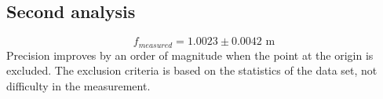 
\clearpage
\subsection{Second analysis}
  \begin{equation}
      f_{measured} = 1.0023 \pm 0.0042 \text{ m}
  \end{equation}
Precision improves by an order of magnitude when the point at the origin is excluded. The exclusion criteria is based on the statistics of the data set, not difficulty in the measurement.

\endinput  %